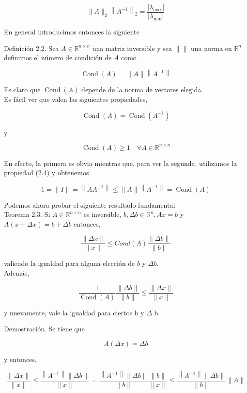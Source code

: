 \documentclass[10pt]{article}
\begin{document}
$$
\|A\|_{2}\left\|A^{-1}\right\|_{2}=\frac{\left|\lambda_{\operatorname{máx}}\right|}{\left|\lambda_{\min }\right|}
$$

En general introducimos entonces la siguiente

Definición 2.2. Sea $A \in \mathbb{R}^{n \times n}$ una matriz inversible y sea $\left\|\|\right.$ una norma en $\mathbb{R}^{n}$ definimos el número de condición de $A$ como

$$
\operatorname{Cond}(A)=\|A\|\left\|A^{-1}\right\|
$$

Es claro que $\operatorname{Cond}(A)$ depende de la norma de vectores elegida.\\
Es fácil ver que valen las siguientes propiedades,

$$
\operatorname{Cond}(A)=\operatorname{Cond}\left(A^{-1}\right)
$$

y

$$
\operatorname{Cond}(A) \geq 1 \quad \forall A \in \mathbb{R}^{n \times n}
$$

En efecto, la primera es obvia mientras que, para ver la segunda, utilizamos la propiedad (2.4) y obtenemos

$$
1=\|I\|=\left\|A A^{-1}\right\| \leq\|A\|\left\|A^{-1}\right\|=\operatorname{Cond}(A)
$$

Podemos ahora probar el siguiente resultado fundamental\\
Teorema 2.3. Si $A \in \mathbb{R}^{n \times n}$ es inversible, $b, \Delta b \in \mathbb{R}^{n}, A x=b$ y $A(x+\Delta x)=b+\Delta b$ entonces,


\begin{equation*}
\frac{\|\Delta x\|}{\|x\|} \leq C o n d(A) \frac{\|\Delta b\|}{\|b\|} \tag{2.5}
\end{equation*}


valiendo la igualdad para alguna elección de $b$ y $\Delta b$.\\
Además,


\begin{equation*}
\frac{1}{\operatorname{Cond}(A)} \frac{\|\Delta b\|}{\|b\|} \leq \frac{\|\Delta x\|}{\|x\|} \tag{2.6}
\end{equation*}


y nuevamente, vale la igualdad para ciertos b y $\Delta$ b.

Demostración. Se tiene que

$$
A(\Delta x)=\Delta b
$$

y entonces,

$$
\frac{\|\Delta x\|}{\|x\|} \leq \frac{\left\|A^{-1}\right\|\|\Delta b\|}{\|x\|}=\frac{\left\|A^{-1}\right\|\|\Delta b\|}{\|b\|} \frac{\|b\|}{\|x\|} \leq \frac{\left\|A^{-1}\right\|\|\Delta b\|}{\|b\|}\|A\|
$$
\end{document}
